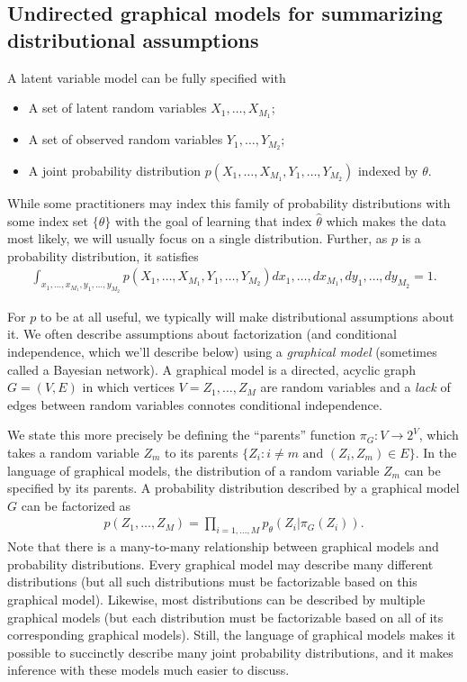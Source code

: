 \subsection{Undirected graphical models for summarizing distributional assumptions}
A latent variable model can be fully specified with
\begin{itemize}
  \item A set of latent random variables $X_1, \ldots, X_{M_1}$;
  \item A set of observed random variables $Y_1, \ldots, Y_{M_2}$;
  \item A joint probability distribution $p(X_1, \ldots,
    X_{M_1}, Y_1, \ldots, Y_{M_2})$ indexed by $\theta$.
\end{itemize}
While some practitioners may index this family of probability
distributions with some index set $\{ \theta \}$ with the goal of
learning that index $\hat \theta$ which makes the data most likely, we
will usually focus on a single distribution.  Further, as $p$ is a
probability distribution, it satisfies 
\begin{align*}
  \int_{x_1, \ldots, x_{M_1},
    y_1, \ldots, y_{M_2}} p(X_1, \ldots, X_{M_1}, Y_1, \ldots, Y_{M_2})
  d x_1, \ldots, d x_{M_1}, d y_1, \ldots, d y_{M_2} = 1.
\end{align*}
  
For $p$ to be at all useful, we typically will make distributional
assumptions about it.  We often describe assumptions about
factorization (and conditional independence, which we'll describe
below) using a \emph{graphical model} (sometimes called a Bayesian
network).  A graphical model is a directed, acyclic graph $G = (V, E)$
in which vertices $V=Z_1, \ldots, Z_M$ are random variables and a
\emph{lack} of edges between random variables connotes conditional
independence.

We state this more precisely be defining the ``parents'' function
$\pi_G : V \rightarrow 2^V$, which takes a random variable $Z_m$ to
its parents $\{ Z_i : i \neq m \mbox{ and } (Z_i, Z_m) \in E \}$.  In
the language of graphical models, the distribution of a random
variable $Z_m$ can be specified by its parents. A probability
distribution described by a graphical model $G$ can be factorized as
\begin{align}
  p(Z_1, \ldots, Z_M) = \prod_{i=1, \ldots, M} p_\theta(Z_i | \pi_G(Z_i) ).
\end{align}
Note that there is a many-to-many relationship between graphical
models and probability distributions. Every graphical model may
describe many different distributions (but all such distributions must
be factorizable based on this graphical model).  Likewise, most
distributions can be described by multiple graphical models (but each
distribution must be factorizable based on all of its corresponding
graphical models). Still, the language of graphical models makes it
possible to succinctly describe many joint probability distributions,
and it makes inference with these models much easier to discuss.

